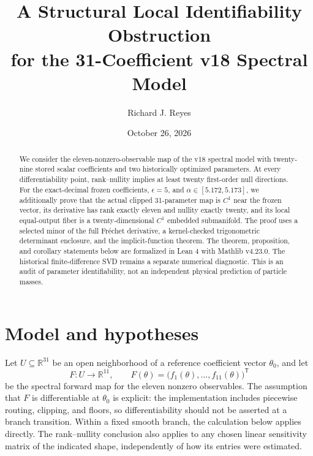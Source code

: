 \documentclass[11pt]{article}
\title{A Structural Local Identifiability Obstruction\\
for the 31-Coefficient v18 Spectral Model}
\author{Richard J. Reyes}
\date{October 26, 2026}
\newcommand{\R}{\mathbb{R}}
\begin{document}
\maketitle

\begin{abstract}
We consider the eleven-nonzero-observable map of the v18 spectral
model with twenty-nine stored scalar coefficients and two historically
optimized parameters. At every differentiability point, rank--nullity
implies at least twenty first-order null directions. For the exact-decimal
frozen coefficients, $\epsilon=5$, and
$\alpha\in[5.172,5.173]$, we additionally prove that the actual clipped
31-parameter map is $C^1$ near the frozen vector, its derivative has rank
exactly eleven and nullity exactly twenty, and its local equal-output
fiber is a twenty-dimensional $C^1$ embedded submanifold. The proof uses
a selected minor of the full Fr\'echet derivative, a kernel-checked
trigonometric determinant enclosure, and the implicit-function theorem.
The theorem, proposition, and corollary statements below are formalized
in Lean 4 with Mathlib v4.23.0.
The historical finite-difference SVD remains a separate numerical
diagnostic. This is an audit of parameter identifiability, not an
independent physical prediction of particle masses.
\end{abstract}

\section{Model and hypotheses}

Let \(U\subseteq\R^{31}\) be an open neighborhood of a reference
coefficient vector \(\theta_0\), and let
\begin{equation}
  F:U\longrightarrow\R^{11},\qquad
  F(\theta)=\bigl(f_1(\theta),\ldots,f_{11}(\theta)\bigr)^{\mathsf T}
  \label{eq:forward}
\end{equation}
be the spectral forward map for the eleven nonzero observables.
The assumption that \(F\) is differentiable at \(\theta_0\) is explicit:
the implementation includes piecewise routing, clipping, and floors,
so differentiability should not be asserted at a branch transition.
Within a fixed smooth branch, the calculation below applies directly.
The rank--nullity conclusion also applies to any chosen linear
sensitivity matrix of the indicated shape, independently of how its
entries were estimated.
\end{document}
